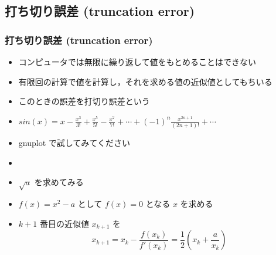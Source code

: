 \subsection{打ち切り誤差 (truncation error)}
\begin{frame}[shrink]
\frametitle{打ち切り誤差 (truncation error)}
  \begin{itemize}
\item コンピュータでは無限に繰り返して値をもとめることはできない
\item 有限回の計算で値を計算し，それを求める値の近似値としてもちいる
\item このときの誤差を打切り誤差という
  \end{itemize}
  \begin{example}
    \begin{itemize}
\item \(sin(x)=x-\frac{x^3}{3!}+\frac{x^5}{5!}-\frac{x^7}{7!}+\cdots+(-1)^{n}\frac{x^{2n+1}}{(2n+1)!}+\cdots\)
\item gnuplot で試してみてください
    \end{itemize}
  \end{example}
  \begin{example}[平方の計算]
    \begin{itemize}
\item \href{run:newton.command}{}
\item \(\sqrt{a}\) を求めてみる
\item \(f(x)=x^2-a\) として \(f(x)=0\) となる $x$ を求める
\item \(k+1\) 番目の近似値 \(x_{k+1}\) を
      \begin{displaymath}
x_{k+1} = x_k-\frac{f(x_k)}{f'(x_k)} = \frac{1}{2}(x_k+\frac{a}{x_k})
      \end{displaymath}
    \end{itemize}
  \end{example}
\end{frame}
